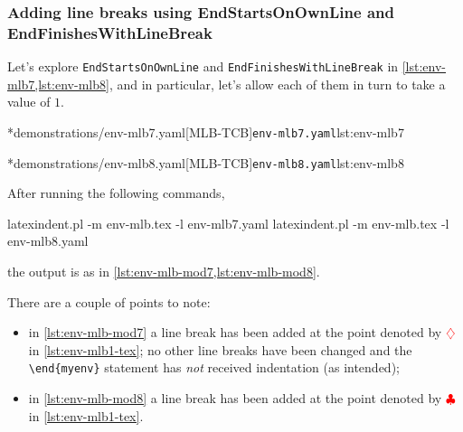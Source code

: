 \subsubsection{Adding line breaks using EndStartsOnOwnLine and EndFinishesWithLineBreak}
	Let's explore \texttt{EndStartsOnOwnLine} and \texttt{EndFinishesWithLineBreak} in
	\cref{lst:env-mlb7,lst:env-mlb8}, and in particular, let's allow each of them in turn to take
	a value of $1$.

	\begin{minipage}{.49\textwidth}
		\cmhlistingsfromfile[style=yaml-LST]*{demonstrations/env-mlb7.yaml}[MLB-TCB]{\texttt{env-mlb7.yaml}}{lst:env-mlb7}
	\end{minipage}
	\hfill
	\begin{minipage}{.49\textwidth}
		\cmhlistingsfromfile[style=yaml-LST]*{demonstrations/env-mlb8.yaml}[MLB-TCB]{\texttt{env-mlb8.yaml}}{lst:env-mlb8}
	\end{minipage}

	After running the following commands,
	\begin{commandshell}
latexindent.pl -m env-mlb.tex -l env-mlb7.yaml
latexindent.pl -m env-mlb.tex -l env-mlb8.yaml
\end{commandshell}
	the output is as in \cref{lst:env-mlb-mod7,lst:env-mlb-mod8}.

	\begin{widepage}
		\begin{minipage}{.42\linewidth}
		\end{minipage}
		\hfill
		\begin{minipage}{.57\linewidth}
		\end{minipage}
	\end{widepage}

	There are a couple of points to note:
	\begin{itemize}
		\item in \cref{lst:env-mlb-mod7} a line break has been added at the point denoted by
		      $\color{red}\diamondsuit$ in \vref{lst:env-mlb1-tex}; no other line breaks have been
		      changed and the \lstinline!\end{myenv}! statement has \emph{not}
		      received indentation (as intended);
		\item in \cref{lst:env-mlb-mod8} a line break has been added at the point denoted by
		      $\color{red}\clubsuit$ in \vref{lst:env-mlb1-tex}.
	\end{itemize}

